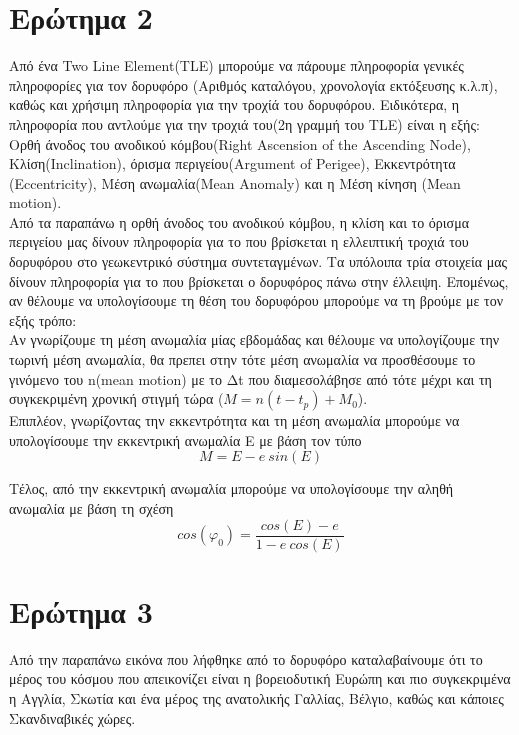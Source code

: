 \documentclass{article}
\begin{document}
\pagebreak
\section{Eρώτημα 2}
Aπό ένα Two Line Element(TLE) μπορούμε να πάρουμε πληροφορία γενικές πληροφορίες για τον δορυφόρο (Αριθμός καταλόγου, χρονολογία εκτόξευσης κ.λ.π), καθώς και χρήσιμη πληροφορία για την τροχίά του δορυφόρου. Ειδικότερα, η πληροφορία που αντλούμε για την τροχιά του(2η γραμμή του TLE) είναι η εξής:\\

\noindent
Ορθή άνοδος του ανοδικού κόμβου(Right Ascension of the Ascending Node), Κλίση(Inclination), όρισμα περιγείου(Argument of Perigee), Εκκεντρότητα (Eccentricity), Μέση ανωμαλία(Μean Anomaly) και η Μέση κίνηση (Mean motion).\\ 

\noindent
Από τα παραπάνω η ορθή άνοδος του ανοδικού κόμβου, η κλίση και το όρισμα περιγείου μας δίνουν πληροφορία για το που βρίσκεται η ελλειπτική τροχιά του δορυφόρου στο γεωκεντρικό σύστημα συντεταγμένων. Τα υπόλοιπα τρία στοιχεία μας δίνουν πληροφορία για το που βρίσκεται ο δορυφόρος πάνω στην έλλειψη. Επομένως, αν θέλουμε να υπολογίσουμε τη θέση του δορυφόρου μπορούμε να τη βρούμε με τον εξής τρόπο:\\

\noindent
Aν γνωρίζουμε τη μέση ανωμαλία μίας εβδομάδας και θέλουμε να υπολογίζουμε την τωρινή μέση ανωμαλία, θα πρεπει στην τότε μέση ανωμαλία να προσθέσουμε το γινόμενο του n(mean motion) με το Δt που διαμεσολάβησε από τότε μέχρι και τη συγκεκριμένη χρονική στιγμή τώρα ($M=n(t-t_{p}) + M_{0}$). \\

\noindent
Eπιπλέον, γνωρίζοντας την εκκεντρότητα και τη μέση ανωμαλία μπορούμε να υπολογίσουμε την εκκεντρική ανωμαλία Ε με βάση τον τύπο
$$Μ = Ε - e \ sin(E)$$

\noindent
Τέλος, από την εκκεντρική ανωμαλία μπορούμε να υπολογίσουμε την αληθή ανωμαλία με βάση τη σχέση 
$$ cos(φ_{0}) =\frac{cos(E) - e}{1 - e \ cos(E)}$$
\section{Eρώτημα 3}
Aπό την παραπάνω εικόνα που λήφθηκε από το δορυφόρο καταλαβαίνουμε ότι το μέρος του κόσμου που απεικονίζει είναι η βορειοδυτική Ευρώπη και πιο συγκεκριμένα η Αγγλία, Σκωτία και ένα μέρος της ανατολικής Γαλλίας, Βέλγιο, καθώς και κάποιες Σκανδιναβικές χώρες. 
\end{document}
